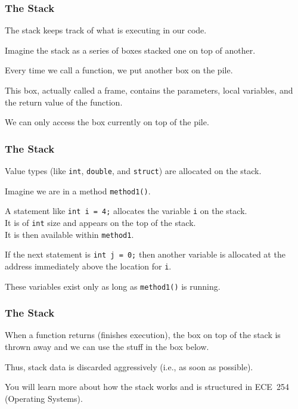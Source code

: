 \begin{frame}
\frametitle{The Stack}

The stack keeps track of what is executing in our code.

Imagine the stack as a series of boxes stacked one on top of another.

Every time we call a function, we put another box on the pile.

This box, actually called a \alert{frame}, contains the parameters, local variables, and the return value of the function.

We can only access the box currently on top of the pile.

\end{frame}

\begin{frame}
\frametitle{The Stack}

Value types (like \texttt{int}, \texttt{double}, and \texttt{struct}) are allocated on the stack.

Imagine we are in a method \texttt{method1()}.

A statement like \texttt{int i = 4;} allocates the variable \texttt{i} on the stack.\\
\quad It is of \texttt{int} size and appears on the top of the stack.\\
\quad It is then available within \texttt{method1}. 

If the next statement is \texttt{int j = 0;} then another variable is allocated at the address immediately above the location for \texttt{i}.

These variables exist only as long as \texttt{method1()} is running.

\end{frame}

\begin{frame}
\frametitle{The Stack}
When a function returns (finishes execution), the box on top of the stack is thrown away and we can use the stuff in the box below.

Thus, stack data is discarded aggressively (i.e., as soon as possible).

You will learn more about how the stack works and is structured in ECE~254 (Operating Systems).

\end{frame}

